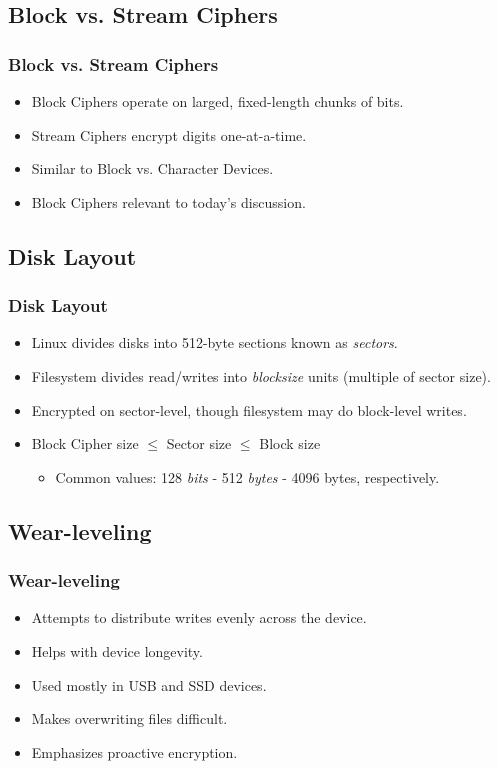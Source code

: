 \documentclass[xcolor={dvipsnames,svgnames},hyperref=dvips]{beamer}
\begin{document}
	\subsection{Block vs. Stream Ciphers}
	\begin{frame}
		\frametitle{Block vs. Stream Ciphers}
		\begin{itemize}
		\item Block Ciphers operate on larged, fixed-length chunks of bits.
		\item Stream Ciphers encrypt digits one-at-a-time.
		\item Similar to Block vs. Character Devices.
		\item Block Ciphers relevant to today's discussion.
		\end{itemize}
	\end{frame}

	\subsection{Disk Layout}
	\begin{frame}
		\frametitle{Disk Layout}
		\begin{itemize}
		\item Linux divides disks into 512-byte sections known as \textit{sectors}.
		\item Filesystem divides read/writes into \textit{blocksize} units (multiple of sector size).
		\item Encrypted on sector-level, though filesystem may do block-level writes.
		\item Block Cipher size $\leq$ Sector size $\leq$ Block size
			\begin{itemize}
			\item Common values: 128 \textit{bits} - 512 \textit{bytes} - 4096 bytes, respectively.
			\end{itemize}
		\end{itemize}
	\end{frame}

	\subsection{Wear-leveling}
	\begin{frame}
		\frametitle{Wear-leveling}
		\begin{itemize}
		\item Attempts to distribute writes evenly across the device.
		\item Helps with device longevity.
		\item Used mostly in USB and SSD devices.
		\item Makes overwriting files difficult.
		\item Emphasizes proactive encryption.
		\end{itemize}
	\end{frame}
\end{document}
